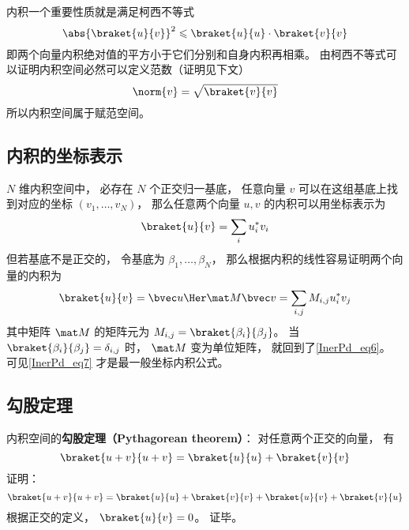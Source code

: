内积一个重要性质就是满足柯西不等式
\begin{equation}
\abs{\braket{u}{v}}^2 \leqslant \braket{u}{u} \cdot \braket{v}{v}
\end{equation}
即两个向量内积绝对值的平方小于它们分别和自身内积再相乘。 由柯西不等式可以证明内积空间必然可以定义范数（证明见下文）
\begin{equation}\label{InerPd_eq8}
\norm{v} = \sqrt{\braket{v}{v}}
\end{equation}
所以内积空间属于赋范空间。

\subsection{内积的坐标表示}
$N$ 维内积空间中， 必存在 $N$ 个正交归一基底， 任意向量 $v$ 可以在这组基底上找到对应的坐标 $(v_1, \dots, v_N)$， 那么任意两个向量 $u, v$ 的内积可以用坐标表示为
\begin{equation}\label{InerPd_eq6}
\braket{u}{v} = \sum_i u_i^* v_i
\end{equation}
但若基底不是正交的， 令基底为 $\beta_1, \dots, \beta_N$， 那么根据内积的线性容易证明两个向量的内积为
\begin{equation}\label{InerPd_eq7}
\braket{u}{v} = \bvec u\Her \mat M \bvec v = \sum_{i,j} M_{i,j} u_i^* v_j
\end{equation}
其中矩阵 $\mat M$ 的矩阵元为 $M_{i,j} = \braket{\beta_i}{\beta_j}$。 当 $\braket{\beta_i}{\beta_j} = \delta_{i,j}$ 时， $\mat M$ 变为单位矩阵， 就回到了\autoref{InerPd_eq6}。 可见\autoref{InerPd_eq7} 才是最一般坐标内积公式。

\subsection{勾股定理}
内积空间的\textbf{勾股定理（Pythagorean theorem）}： 对任意两个正交的向量， 有
\begin{equation}\label{InerPd_eq1}
\braket{u + v}{u + v} = \braket{u}{u} + \braket{v}{v}
\end{equation}
证明：
\begin{equation}
\braket{u + v}{u + v} = \braket{u}{u} + \braket{v}{v} + \braket{u}{v} + \braket{v}{u}
\end{equation}
根据正交的定义， $\braket{u}{v} = 0$。 证毕。

